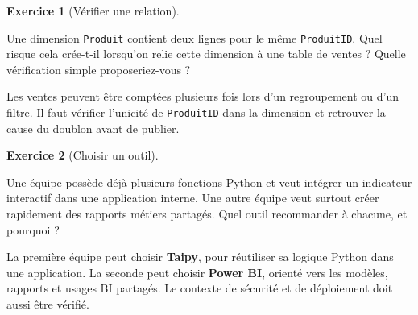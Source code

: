 \documentclass[
  french,
  letterpaper,
  open=any]{scrbook}
\theoremstyle{definition}
\theoremstyle{definition}
\newtheorem{exercise}{Exercice}[section]
\theoremstyle{remark}
\begin{document}
\begin{exercise}[Vérifier une
relation]\protect\hypertarget{exr-bi-5}{}\label{exr-bi-5}

Une dimension \texttt{Produit} contient deux lignes pour le même
\texttt{ProduitID}. Quel risque cela crée-t-il lorsqu'on relie cette
dimension à une table de ventes ? Quelle vérification simple
proposeriez-vous ?

\end{exercise}

\begin{tcolorbox}[enhanced jigsaw, arc=.35mm, bottomrule=.15mm, bottomtitle=1mm, breakable, colback=white, colbacktitle=quarto-callout-tip-color!10!white, colframe=quarto-callout-tip-color-frame, coltitle=black, left=2mm, leftrule=.75mm, opacityback=0, opacitybacktitle=0.6, rightrule=.15mm, title=\textcolor{quarto-callout-tip-color}{\faLightbulb}\hspace{0.5em}{Solution de l'exercice Exercice~\ref{exr-bi-5}}, titlerule=0mm, toprule=.15mm, toptitle=1mm]

Les ventes peuvent être comptées plusieurs fois lors d'un regroupement
ou d'un filtre. Il faut vérifier l'unicité de \texttt{ProduitID} dans la
dimension et retrouver la cause du doublon avant de publier.

\end{tcolorbox}

\begin{exercise}[Choisir un
outil]\protect\hypertarget{exr-bi-6}{}\label{exr-bi-6}

Une équipe possède déjà plusieurs fonctions Python et veut intégrer un
indicateur interactif dans une application interne. Une autre équipe
veut surtout créer rapidement des rapports métiers partagés. Quel outil
recommander à chacune, et pourquoi ?

\end{exercise}

\begin{tcolorbox}[enhanced jigsaw, arc=.35mm, bottomrule=.15mm, bottomtitle=1mm, breakable, colback=white, colbacktitle=quarto-callout-tip-color!10!white, colframe=quarto-callout-tip-color-frame, coltitle=black, left=2mm, leftrule=.75mm, opacityback=0, opacitybacktitle=0.6, rightrule=.15mm, title=\textcolor{quarto-callout-tip-color}{\faLightbulb}\hspace{0.5em}{Solution de l'exercice Exercice~\ref{exr-bi-6}}, titlerule=0mm, toprule=.15mm, toptitle=1mm]

La première équipe peut choisir \textbf{Taipy}, pour réutiliser sa
logique Python dans une application. La seconde peut choisir
\textbf{Power BI}, orienté vers les modèles, rapports et usages BI
partagés. Le contexte de sécurité et de déploiement doit aussi être
vérifié.

\end{tcolorbox}
\end{document}
